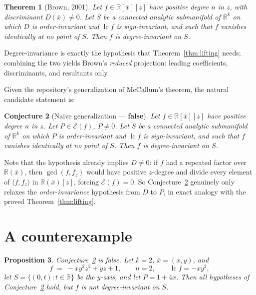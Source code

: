 \documentclass[11pt,a4paper]{article}
\newtheorem{theorem}{Theorem}[section]
\newtheorem{proposition}[theorem]{Proposition}
\newtheorem{conjecture}[theorem]{Conjecture}
\theoremstyle{definition}
\newcommand{\R}{\mathbb{R}}
\newcommand{\xb}{\bar{x}}
\newcommand{\lc}{\operatorname{lc}}
\newcommand{\E}{\mathcal{E}}
\newcommand{\ideal}[1]{\langle #1\rangle}
\begin{document}
\begin{theorem}[Brown, 2001]\label{thm:brown}
Let $f \in \R[\xb][z]$ have positive degree $n$ in $z$, with discriminant
$D(\xb) \neq 0$. Let $S$ be a connected analytic submanifold of $\R^k$ on which
$D$ is order-invariant and $\lc f$ is sign-invariant, and such that $f$
vanishes identically at no point of $S$. Then $f$ is degree-invariant on $S$.
\end{theorem}

Degree-invariance is exactly the hypothesis that Theorem~\ref{thm:lifting}
needs; combining the two yields Brown's \emph{reduced} projection: leading
coefficients, discriminants, and resultants only.

Given the repository's generalization of McCallum's theorem, the natural
candidate statement is:

\begin{conjecture}[Naive generalization --- \textbf{false}]\label{conj:naive}
Let $f \in \R[\xb][z]$ have positive degree $n$ in $z$. Let $P \in \E(f)$,
$P \neq 0$. Let $S$ be a connected analytic submanifold of $\R^k$ on which $P$
is order-invariant and $\lc f$ is sign-invariant, and such that $f$ vanishes
identically at no point of $S$. Then $f$ is degree-invariant on $S$.
\end{conjecture}

Note that the hypothesis already implies $D \neq 0$: if $f$ had a repeated
factor over $\R(\xb)$, then $\gcd(f,f_z)$ would have positive $z$-degree and
divide every element of $\ideal{f,f_z}$ in $\R(\xb)[z]$, forcing
$\E(f) = 0$. So Conjecture~\ref{conj:naive} genuinely only relaxes the
\emph{order-invariance} hypothesis from $D$ to $P$, in exact analogy with the
proved Theorem~\ref{thm:lifting}.

\section{A counterexample}\label{sec:counterexample}

\begin{proposition}\label{prop:counterexample}
Conjecture~\ref{conj:naive} is false. Let $k = 2$, $\xb = (x,y)$, and
\[
  f \;=\; -x y^2 z^2 + y z + 1, \qquad n = 2, \qquad \lc f = -xy^2 ,
\]
let $S = \{(0,t) : t \in \R\}$ be the $y$-axis, and let $P = 1 + 4x$. Then all
hypotheses of Conjecture~\ref{conj:naive} hold, but $f$ is not degree-invariant
on $S$.
\end{proposition}
\end{document}
